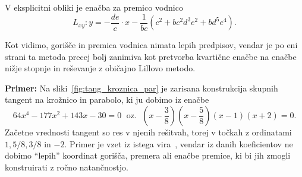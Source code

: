 V eksplicitni obliki je enačba za premico vodnico
$$ L_{xy}: y = -\frac{de}{c} \cdot x - \frac{1}{bc} (c^2 + bc^2d^3e^2 + bd^5e^4). $$

Kot vidimo, gorišče in premica vodnica nimata lepih predpisov, vendar je po eni strani ta metoda precej bolj zanimiva kot pretvorba kvartične enačbe na enačbe nižje stopnje in reševanje z običajno Lillovo metodo.

\textbf{Primer:} Na sliki~\ref{fig:tang_kroznica_par} je zarisana konstrukcija skupnih tangent na krožnico in parabolo, ki ju dobimo iz enačbe
$$ 64x^4 - 177x^2 + 143x - 30 = 0 \; \text{ oz. } \; \left(x - \frac{3}{8}\right) \left(x - \frac{5}{8}\right) (x-1) (x+2) = 0.$$
Začetne vrednosti tangent so res v njenih rešitvah, torej v točkah z ordinatami $1, 5/8, 3/8$ in $-2$. Primer je vzet iz istega vira~\cite[str.\ 25]{edwards2001}, vendar iz danih koeficientov ne dobimo ``lepih'' koordinat gorišča, premera ali enačbe premice, ki bi jih zmogli konstruirati z ročno natančnostjo.

